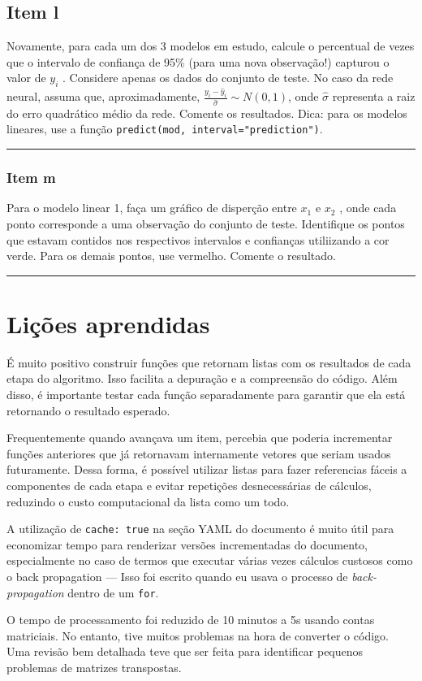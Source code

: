 \documentclass[
  a4paperpaper,
]{article}
\begin{document}
\subsection{Item l}\label{item-l}

Novamente, para cada um dos 3 modelos em estudo, calcule o percentual de
vezes que o intervalo de confiança de 95\% (para uma nova observação!)
capturou o valor de \(y_i\) . Considere apenas os dados do conjunto de
teste. No caso da rede neural, assuma que, aproximadamente,
\(\frac{y_i - \hat{y}_i}{\hat{\sigma}} ∼ N (0, 1)\), onde
\(\hat{\sigma}\) representa a raiz do erro quadrático médio da rede.
Comente os resultados. Dica: para os modelos lineares, use a função
\texttt{predict(mod,\ interval="prediction")}.

\begin{center}\rule{0.5\linewidth}{0.5pt}\end{center}

\subsubsection{Item m}\label{item-m}

Para o modelo linear 1, faça um gráfico de disperção entre \(x_1\) e
\(x_2\) , onde cada ponto corresponde a uma observação do conjunto de
teste. Identifique os pontos que estavam contidos nos respectivos
intervalos e confianças utiliizando a cor verde. Para os demais pontos,
use vermelho. Comente o resultado.

\begin{center}\rule{0.5\linewidth}{0.5pt}\end{center}

\section{Lições aprendidas}\label{liuxe7uxf5es-aprendidas}

É muito positivo construir funções que retornam listas com os resultados
de cada etapa do algoritmo. Isso facilita a depuração e a compreensão do
código. Além disso, é importante testar cada função separadamente para
garantir que ela está retornando o resultado esperado.

Frequentemente quando avançava um item, percebia que poderia incrementar
funções anteriores que já retornavam internamente vetores que seriam
usados futuramente. Dessa forma, é possível utilizar listas para fazer
referencias fáceis a componentes de cada etapa e evitar repetições
desnecessárias de cálculos, reduzindo o custo computacional da lista
como um todo.

A utilização de \texttt{cache:\ true} na seção YAML do documento é muito
útil para economizar tempo para renderizar versões incrementadas do
documento, especialmente no caso de termos que executar várias vezes
cálculos custosos como o back propagation --- Isso foi escrito quando eu
usava o processo de \emph{back-propagation} dentro de um \texttt{for}.

O tempo de processamento foi reduzido de 10 minutos a 5s usando contas
matriciais. No entanto, tive muitos problemas na hora de converter o
código. Uma revisão bem detalhada teve que ser feita para identificar
pequenos problemas de matrizes transpostas.
\end{document}
